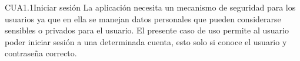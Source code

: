 
\begin{UseCase}{CUA1.1}{Iniciar sesión}
    {
	La aplicación necesita un mecanismo de seguridad para los usuarios ya que en ella se manejan datos personales que pueden considerarse sensibles o privados para el usuario. El presente caso de uso permite al usuario poder iniciar sesión a una determinada cuenta, esto solo si conoce el usuario y contraseña correcto. 
    }

\end{UseCase}
